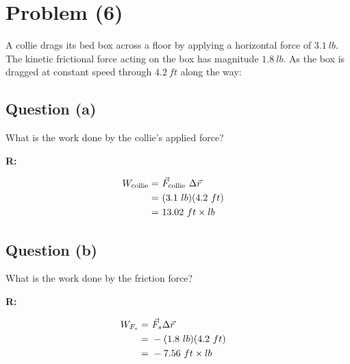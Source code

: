 \section{Problem (6)}
	A collie drags its bed box across a floor by applying a horizontal force of $3.1 \ lb$. The kinetic frictional force acting on the box has magnitude $1.8 \ lb$. As the box is dragged at constant speed through $4.2 \ ft$ along the way:

	\subsection{Question (a)}

		What is the work done by the collie's applied force?

		\textbf{R:}

		\begin{align}
			W_{\text{collie}} = \ &\vec{F}_{\text{collie}} \ \Delta \vec{r}& \notag \\
			= \ &(3.1 \ lb)(4.2 \ ft)& \notag \\
			= \ &13.02 \ ft \times lb& \notag
		\end{align}

	\subsection{Question (b)}

		What is the work done by the friction force?

		\textbf{R:}

		\begin{align}
			W_{F_{s}} = \ &\vec{F}_{s} \Delta \vec{r}& \notag \\
			= \ &-(1.8 \ lb)(4.2 \ ft)& \notag \\
			= \ &-7.56 \ ft \times lb& \notag
		\end{align}
